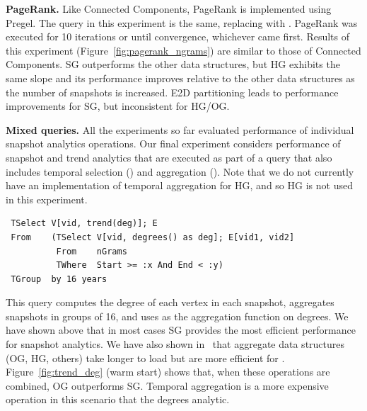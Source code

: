 
{\bf PageRank.} Like Connected Components, PageRank is implemented
using Pregel.  The query in this experiment is the same, replacing
 with .  PageRank was executed for
10 iterations or until convergence, whichever came first.  Results of
this experiment (Figure~\ref{fig:pagerank_ngrams}) are similar to
those of Connected Components.  SG outperforms the other data
structures, but HG exhibits the same slope and its performance
improves relative to the other data structures as the number of
snapshots is increased.  E2D partitioning leads to performance
improvements for SG, but inconsistent for HG/OG.


{\bf Mixed queries.} All the experiments so far evaluated performance
of individual \ql snapshot analytics operations.  Our final experiment
considers performance of snapshot and trend analytics that are
executed as part of a query that also includes temporal selection
() and aggregation ().  Note that we do
not currently have an implementation of temporal aggregation for HG,
and so HG is not used in this experiment.

\begin{small}
\begin{verbatim}
 TSelect V[vid, trend(deg)]; E
 From    (TSelect V[vid, degrees() as deg]; E[vid1, vid2]
          From    nGrams
          TWhere  Start >= :x And End < :y)
 TGroup  by 16 years
\end{verbatim}
\end{small}

This query computes the degree of each vertex in each snapshot,
aggregates snapshots in groups of 16, and uses  as the
aggregation function on degrees.  We have shown above that in most
cases SG provides the most efficient performance for snapshot
analytics.  We have also shown in~\cite{PortalarXiv2016} that
aggregate data structures (OG, HG, others) take longer to load but are
more efficient for .  Figure~\ref{fig:trend_deg} (warm
start) shows that, when these operations are combined, OG outperforms
SG.  Temporal aggregation is a more expensive operation in this
scenario that the degrees analytic.

